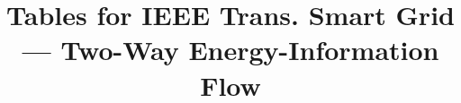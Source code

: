 \documentclass[10pt,journal]{IEEEtran}
\begin{document}
\title{Tables for IEEE Trans. Smart Grid --- Two-Way Energy-Information Flow}
\maketitle











\end{document}
